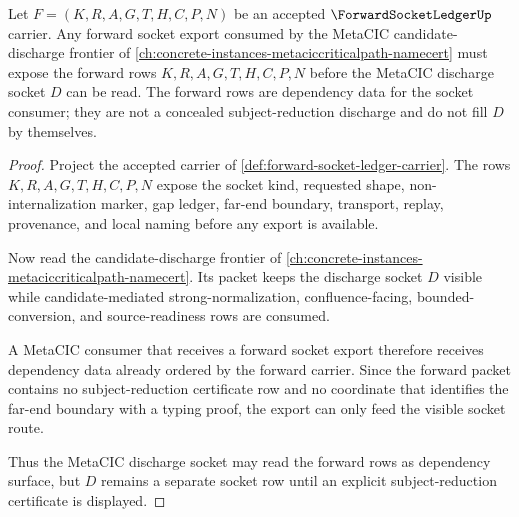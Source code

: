 \begin{theorem}
\label{thm:forward-socket-ledger-metacic-candidate-discharge-route}
Let $F=(K,R,A,G,T,H,C,P,N)$ be an accepted $\ForwardSocketLedgerUp$ carrier. Any forward socket export consumed by the MetaCIC candidate-discharge frontier of \autoref{ch:concrete-instances-metaciccriticalpath-namecert} must expose the forward rows $K,R,A,G,T,H,C,P,N$ before the MetaCIC discharge socket $D$ can be read. The forward rows are dependency data for the socket consumer; they are not a concealed subject-reduction discharge and do not fill $D$ by themselves.
\end{theorem}
\begin{proof}
Project the accepted carrier of \autoref{def:forward-socket-ledger-carrier}. The rows $K,R,A,G,T,H,C,P,N$ expose the socket kind, requested shape, non-internalization marker, gap ledger, far-end boundary, transport, replay, provenance, and local naming before any export is available.

Now read the candidate-discharge frontier of \autoref{ch:concrete-instances-metaciccriticalpath-namecert}. Its packet keeps the discharge socket $D$ visible while candidate-mediated strong-normalization, confluence-facing, bounded-conversion, and source-readiness rows are consumed.

A MetaCIC consumer that receives a forward socket export therefore receives dependency data already ordered by the forward carrier. Since the forward packet contains no subject-reduction certificate row and no coordinate that identifies the far-end boundary with a typing proof, the export can only feed the visible socket route.

Thus the MetaCIC discharge socket may read the forward rows as dependency surface, but $D$ remains a separate socket row until an explicit subject-reduction certificate is displayed.
\end{proof}
